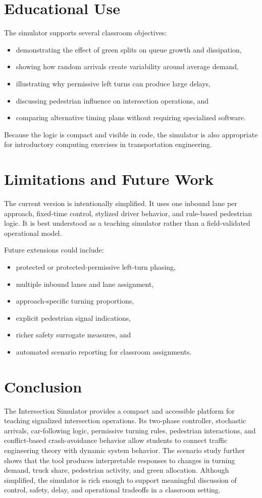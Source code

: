 \documentclass[conference]{IEEEtran}
\begin{document}
\section{Educational Use}
The simulator supports several classroom objectives:
\begin{itemize}
\item demonstrating the effect of green splits on queue growth and dissipation,
\item showing how random arrivals create variability around average demand,
\item illustrating why permissive left turns can produce large delays,
\item discussing pedestrian influence on intersection operations, and
\item comparing alternative timing plans without requiring specialized software.
\end{itemize}

Because the logic is compact and visible in code, the simulator is also appropriate for introductory computing exercises in transportation engineering.

\section{Limitations and Future Work}
The current version is intentionally simplified. It uses one inbound lane per approach, fixed-time control, stylized driver behavior, and rule-based pedestrian logic. It is best understood as a teaching simulator rather than a field-validated operational model.

Future extensions could include:
\begin{itemize}
\item protected or protected-permissive left-turn phasing,
\item multiple inbound lanes and lane assignment,
\item approach-specific turning proportions,
\item explicit pedestrian signal indications,
\item richer safety surrogate measures, and
\item automated scenario reporting for classroom assignments.
\end{itemize}

\section{Conclusion}
The Intersection Simulator provides a compact and accessible platform for teaching signalized intersection operations. Its two-phase controller, stochastic arrivals, car-following logic, permissive turning rules, pedestrian interactions, and conflict-based crash-avoidance behavior allow students to connect traffic engineering theory with dynamic system behavior. The scenario study further shows that the tool produces interpretable responses to changes in turning demand, truck share, pedestrian activity, and green allocation. Although simplified, the simulator is rich enough to support meaningful discussion of control, safety, delay, and operational tradeoffs in a classroom setting.
\end{document}
